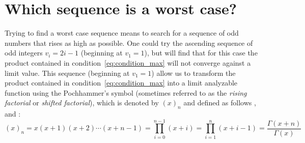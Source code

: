 

\section{Which sequence is a worst case?}
\label{sec:worstcase_k3}
Trying to find a worst case sequence means to search for a sequence of odd numbers that rises as high as possible. One could try the ascending sequence of odd integers $v_i=2i-1$ (beginning at $v_1=1$), but will find that for this case the product contained in condition~\ref{eq:condition_max} will not converge against a limit value. This sequence (beginning at $v_1=1$) allow us to transform the product contained in condition~\ref{eq:condition_max} into a limit analyzable function using the Pochhammer’s symbol (sometimes referred to as the \textit{rising factorial} or \textit{shifted factorial}), which is denoted by $(x)_n$ and defined as follows \cite{Ref_Zwillinger_Kokoska}, \cite[p.~679]{Ref_Brychkov} and \cite[p.~1005]{Ref_Trott}:
\[
(x)_n=x(x+1)(x+2)\cdots(x+n-1)=\prod_{i=0}^{n-1}(x+i)=\prod_{i=1}^{n}(x+i-1)=\frac{\Gamma(x+n)}{\Gamma(x)}
\]

